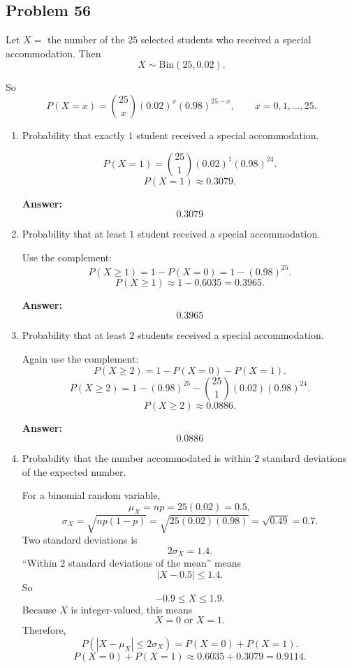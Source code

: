 \documentclass[11pt]{article}
\begin{document}
\subsection*{Problem 56}

Let \(X=\) the number of the \(25\) selected students who received a special accommodation. Then
\[
X\sim \mathrm{Bin}(25,0.02).
\]

So
\[
P(X=x)=\binom{25}{x}(0.02)^x(0.98)^{25-x}, \qquad x=0,1,\dots,25.
\]

\begin{enumerate}
    \item[(a)] Probability that exactly \(1\) student received a special accommodation.

    \[
    P(X=1)=\binom{25}{1}(0.02)^1(0.98)^{24}.
    \]
    \[
    P(X=1)\approx 0.3079.
    \]

    \textbf{Answer:}
    \[
    \boxed{0.3079}
    \]

    \item[(b)] Probability that at least \(1\) student received a special accommodation.

    Use the complement:
    \[
    P(X\ge 1)=1-P(X=0)=1-(0.98)^{25}.
    \]
    \[
    P(X\ge 1)\approx 1-0.6035=0.3965.
    \]

    \textbf{Answer:}
    \[
    \boxed{0.3965}
    \]

    \item[(c)] Probability that at least \(2\) students received a special accommodation.

    Again use the complement:
    \[
    P(X\ge 2)=1-P(X=0)-P(X=1).
    \]
    \[
    P(X\ge 2)=1-(0.98)^{25}-\binom{25}{1}(0.02)(0.98)^{24}.
    \]
    \[
    P(X\ge 2)\approx 0.0886.
    \]

    \textbf{Answer:}
    \[
    \boxed{0.0886}
    \]

    \item[(d)] Probability that the number accommodated is within \(2\) standard deviations of the expected number.

    For a binomial random variable,
    \[
    \mu_X=np=25(0.02)=0.5,
    \]
    \[
    \sigma_X=\sqrt{np(1-p)}=\sqrt{25(0.02)(0.98)}=\sqrt{0.49}=0.7.
    \]
    Two standard deviations is
    \[
    2\sigma_X=1.4.
    \]
    “Within \(2\) standard deviations of the mean” means
    \[
    |X-0.5|\le 1.4.
    \]
    So
    \[
    -0.9\le X\le 1.9.
    \]
    Because \(X\) is integer-valued, this means
    \[
    X=0 \text{ or } X=1.
    \]
    Therefore,
    \[
    P(|X-\mu_X|\le 2\sigma_X)=P(X=0)+P(X=1).
    \]
    \[
    P(X=0)+P(X=1)\approx 0.6035+0.3079=0.9114.
    \]


\end{enumerate}
\end{document}
